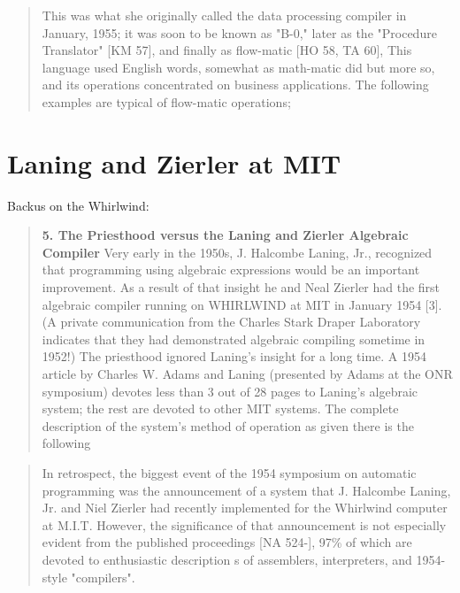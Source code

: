 \begin{quotation}
    This was what she originally called the data processing compiler in January,
    1955; it was soon to be known as "B-0," later as the "Procedure Translator" [KM
    57], and finally as flow-matic [HO 58, TA 60], This language used English
    words, somewhat as math-matic did but more so, and its operations concentrated
    on business applications. The following examples are typical of flow-matic
    operations;
    \cite{history_of_computing_in_the_twentieth_century_1980}
\end{quotation}

\section{Laning and Zierler at MIT}
\label{sec:laning-zierler}


Backus on the Whirlwind\cite{Backus_1980_Programming_in_America_in_1950s}:
\begin{quotation}
    \textbf{5. The Priesthood versus the Laning and Zierler Algebraic Compiler}
    Very early in the 1950s, J. Halcombe Laning, Jr., recognized that programming using algebraic expressions would be an important improvement.
    As a result of that insight he and Neal Zierler had the first algebraic compiler
    running on WHIRLWIND at MIT in January 1954 [3]. (A private communication from the Charles Stark Draper Laboratory indicates that they had
    demonstrated algebraic compiling sometime in 1952!) The priesthood ignored Laning's insight for a long time. A 1954 article by Charles W. Adams
    and Laning (presented by Adams at the ONR symposium) devotes less than
    3 out of 28 pages to Laning's algebraic system; the rest are devoted to other
    MIT systems. The complete description of the system's method of operation
    as given there is the following
\end{quotation}

\begin{quotation}
    In retrospect, the biggest event of the 1954 symposium on automatic programming
    was the announcement of a system that J. Halcombe Laning, Jr. and Niel Zierler
    had recently implemented for the Whirlwind computer at M.I.T.  However, the
    significance of that announcement is not especially evident from the published
    proceedings [NA 524-], 97\% of which are devoted to enthusiastic description s
    of assemblers, interpreters, and 1954-style "compilers".
    \cite{Knuth_TrabbPardo_1976_Early_Development}
\end{quotation}

